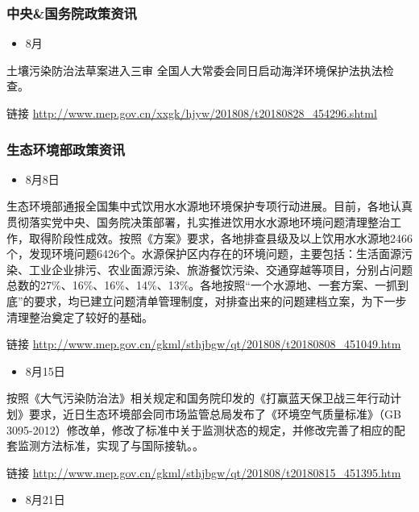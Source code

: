 \documentclass[]{book}
\providecommand{\tightlist}{%
  \setlength{\itemsep}{0pt}\setlength{\parskip}{0pt}}
\begin{document}
\subsubsection*{中央\&国务院政策资讯}\label{-4}

\begin{itemize}
\tightlist
\item
  8月
\end{itemize}

土壤污染防治法草案进入三审
全国人大常委会同日启动海洋环境保护法执法检查。

链接 \url{http://www.mep.gov.cn/xxgk/hjyw/201808/t20180828_454296.shtml}

\subsubsection*{生态环境部政策资讯}\label{-4}

\begin{itemize}
\tightlist
\item
  8月8日
\end{itemize}

生态环境部通报全国集中式饮用水水源地环境保护专项行动进展。目前，各地认真贯彻落实党中央、国务院决策部署，扎实推进饮用水水源地环境问题清理整治工作，取得阶段性成效。按照《方案》要求，各地排查县级及以上饮用水水源地2466个，发现环境问题6426个。水源保护区内存在的环境问题，主要包括：生活面源污染、工业企业排污、农业面源污染、旅游餐饮污染、交通穿越等项目，分别占问题总数的27\%、16\%、16\%、14\%、13\%。各地按照``一个水源地、一套方案、一抓到底''的要求，均已建立问题清单管理制度，对排查出来的问题建档立案，为下一步清理整治奠定了较好的基础。

链接
\url{http://www.mep.gov.cn/gkml/sthjbgw/qt/201808/t20180808_451049.htm}

\begin{itemize}
\tightlist
\item
  8月15日
\end{itemize}

按照《大气污染防治法》相关规定和国务院印发的《打赢蓝天保卫战三年行动计划》要求，近日生态环境部会同市场监管总局发布了《环境空气质量标准》（GB
3095-2012）修改单，修改了标准中关于监测状态的规定，并修改完善了相应的配套监测方法标准，实现了与国际接轨。。

链接
\url{http://www.mep.gov.cn/gkml/sthjbgw/qt/201808/t20180815_451395.htm}

\begin{itemize}
\tightlist
\item
  8月21日
\end{itemize}
\end{document}
